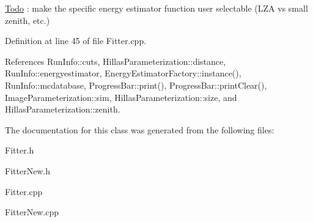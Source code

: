 \begin{Desc}
\item[\hyperlink{todo__todo000017}{Todo}]: make the specific energy estimator function user selectable (LZA vs small zenith, etc.) \end{Desc}


Definition at line 45 of file Fitter.cpp.



References RunInfo::cuts, HillasParameterization::distance, RunInfo::energyestimator, EnergyEstimatorFactory::instance(), RunInfo::mcdatabase, ProgressBar::print(), ProgressBar::printClear(), ImageParameterization::sim, HillasParameterization::size, and HillasParameterization::zenith.



The documentation for this class was generated from the following files:\begin{DoxyCompactItemize}
\item 
Fitter.h\item 
FitterNew.h\item 
Fitter.cpp\item 
FitterNew.cpp\end{DoxyCompactItemize}
